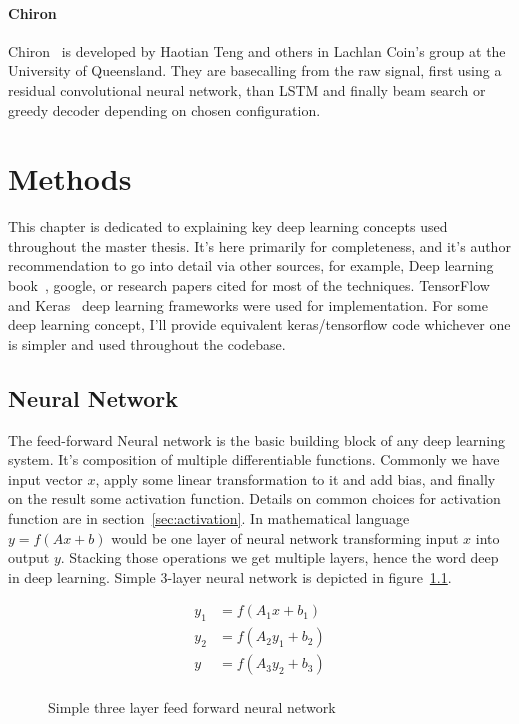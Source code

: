 \documentclass[times, utf8, diplomski, english]{fer}
\begin{document}
\subsubsection{Chiron}
Chiron~\citep{chiron_teng} is developed by Haotian Teng and others in Lachlan Coin's group at the University of Queensland. They are basecalling from the raw signal, first using a residual convolutional neural network, than LSTM and finally beam search or greedy decoder depending on chosen configuration. 

\chapter{Methods}
\label{chap:methods}
This chapter is dedicated to explaining key deep learning concepts used throughout the master thesis. It's here primarily for completeness, and it's author recommendation to go into detail via other sources, for example, Deep learning book~\citep{deep_learning_book-Goodfellow-et-al-2016}, google, or research papers cited for most of the techniques. TensorFlow~\citep{tensorflow2015-whitepaper} and Keras~\citep{chollet2015keras} deep learning frameworks were used for implementation. For some deep learning concept, I'll provide equivalent keras/tensorflow code whichever one is simpler and used throughout the codebase. 

\section{Neural Network}
The feed-forward Neural network is the basic building block of any deep learning system. It's composition of multiple differentiable functions. Commonly we have input vector $x$, apply some linear transformation to it and add bias, and finally on the result some activation function. Details on common choices for activation function are in section~\ref{sec:activation}. In mathematical language $y = f(Ax + b)$ would be one layer of neural network transforming input $x$ into output $y$. Stacking those operations we get multiple layers, hence the word deep in deep learning. Simple 3-layer neural network is depicted in figure~\ref{fg:nn}.

\begin{figure}[!ht]
    \begin{center}
        \begin{align*}
            y_1 &= f(A_1x + b_1) \\
            y_2 &= f(A_2y_1 + b_2) \\
            y &= f(A_3y_2 + b_3) \\
        \end{align*}
        \caption{Simple three layer feed forward neural network}
        \label{fg:nn}
    \end{center}
\end{figure}
\end{document}
